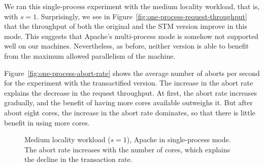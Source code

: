\documentclass[preprint,11pt]{sigplanconf}
\begin{document}
We ran this single-process experiment with the medium locality workload,
that is, with $s=1$. Surprisingly, we see
in Figure~\ref{fig:one-process-request-throughput} that the
throughput of both the original and the STM version improve in this mode.
This suggests that Apache's multi-process mode is somehow not supported
well on our machines. Nevertheless, as before, neither version is able to 
benefit from the maximum allowed parallelism of the machine. 

Figure~\ref{fig:one-process-abort-rate} shows the average number of aborts
per second for the experiment with the transactified version. 
The increase in the abort rate explains the decrease in the request
throughput. At first, the abort rate increases gradually, 
and the benefit of having more cores available outweighs it.
But after about eight cores, the increase in the abort rate dominates,
so that there is little benefit in using more cores. 

\begin{figure}
 \centering
 \hfill
 \caption{Medium locality workload ($s = 1$), Apache in single-process mode.
 The abort rate increases with the number of cores, which explains the decline 
 in the transaction rate.}
\end{figure}
\end{document}
